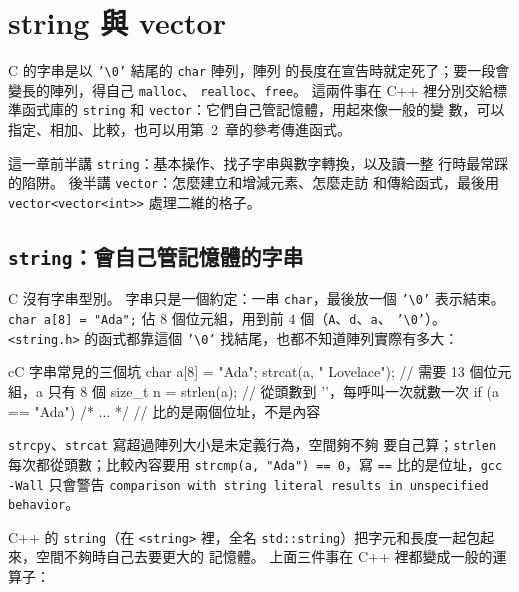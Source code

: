 \chapter{string 與 vector}
\label{ch:string-and-vector}

C 的字串是以 \texttt{'\textbackslash 0'} 結尾的 \texttt{char} 陣列，陣列
的長度在宣告時就定死了；要一段會變長的陣列，得自己 \texttt{malloc}、
\texttt{realloc}、\texttt{free}。 這兩件事在 C++ 裡分別交給標準函式庫的
\texttt{string} 和 \texttt{vector}：它們自己管記憶體，用起來像一般的變
數，可以指定、相加、比較，也可以用第~2~章的參考傳進函式。

這一章前半講 \texttt{string}：基本操作、找子字串與數字轉換，以及讀一整
行時最常踩的陷阱。 後半講 \texttt{vector}：怎麼建立和增減元素、怎麼走訪
和傳給函式，最後用 \texttt{vector<vector<int>>} 處理二維的格子。

\section{\texttt{string}：會自己管記憶體的字串}
\label{sec:string}

\begin{crecap}
C 沒有字串型別。 字串只是一個約定：一串 \texttt{char}，最後放一個
\texttt{'\textbackslash 0'} 表示結束。 \texttt{char a[8] = "Ada";} 佔
$8$ 個位元組，用到前 $4$ 個（\texttt{A}、\texttt{d}、\texttt{a}、
\texttt{'\textbackslash 0'}）。 \texttt{<string.h>} 的函式都靠這個
\texttt{'\textbackslash 0'} 找結尾，也都不知道陣列實際有多大：

\begin{code}{c}{C 字串常見的三個坑}
char a[8] = "Ada";
strcat(a, " Lovelace");     // 需要 13 個位元組，a 只有 8 個
size_t n = strlen(a);       // 從頭數到 '\0'，每呼叫一次就數一次
if (a == "Ada") { /* ... */ }  // 比的是兩個位址，不是內容
\end{code}

\texttt{strcpy}、\texttt{strcat} 寫超過陣列大小是未定義行為，空間夠不夠
要自己算；\texttt{strlen} 每次都從頭數；比較內容要用
\texttt{strcmp(a, "Ada") == 0}，寫 \texttt{==} 比的是位址，\texttt{gcc
-Wall} 只會警告 \texttt{comparison with string literal results in
unspecified behavior}。
\end{crecap}

C++ 的 \texttt{string}（在 \texttt{<string>} 裡，全名
\texttt{std::string}）把字元和長度一起包起來，空間不夠時自己去要更大的
記憶體。 上面三件事在 C++ 裡都變成一般的運算子：

